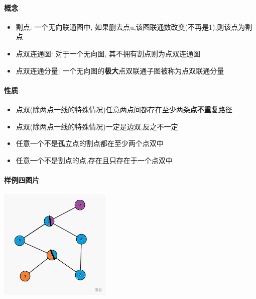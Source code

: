 \paragraph{概念}

\begin{itemize}
    \item 割点: 一个无向联通图中, 如果删去点u,该图联通数改变(不再是1),则该点为割点
    \item 点双连通图: 对于一个无向图, 其不拥有割点则为点双连通图
    \item 点双连通分量: 一个无向图的\textbf{极大}点双联通子图被称为点双联通分量
\end{itemize}

\paragraph{性质}

\begin{itemize}
    \item 点双(除两点一线的特殊情况)任意两点间都存在至少两条\textbf{点不重复}路径
    \item 点双(除两点一线的特殊情况)一定是边双,反之不一定
    \item 任意一个不是孤立点的割点都在至少两个点双中
    \item 任意一个不是割点的点,存在且只存在于一个点双中
\end{itemize}

\paragraph{样例四图片}

\includegraphics[width=0.4\textwidth]{img/luogu-P8435-1.png}
